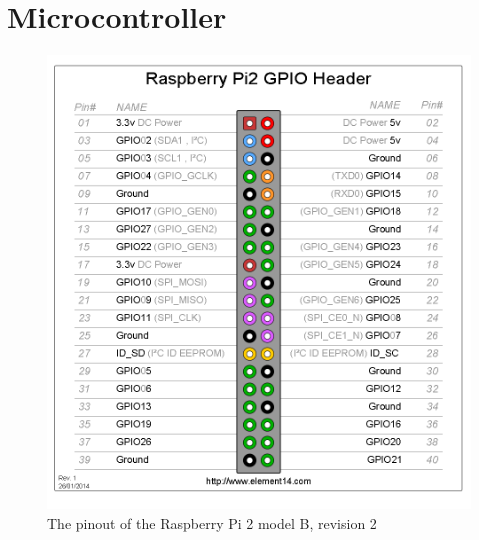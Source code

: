 \section{Microcontroller}


\begin{figure}[H]
	\centering
	\includegraphics[scale=.4]{images/GPIO_Pi2.png}
	\caption{The pinout of the Raspberry Pi 2 model B, revision 2}
	\label{fig:gpioraspbi2}
\end{figure}

